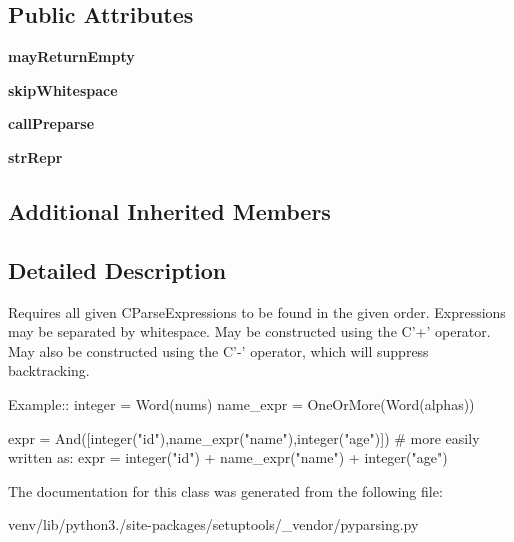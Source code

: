 \subsection*{Public Attributes}
\begin{DoxyCompactItemize}
\item 
\mbox{\label{classsetuptools_1_1__vendor_1_1pyparsing_1_1_and_ae9cb0d562228054fc0e1a2ceae114ede}} 
{\bfseries may\+Return\+Empty}
\item 
\mbox{\label{classsetuptools_1_1__vendor_1_1pyparsing_1_1_and_ab1188a09b994a812be606006583ecb59}} 
{\bfseries skip\+Whitespace}
\item 
\mbox{\label{classsetuptools_1_1__vendor_1_1pyparsing_1_1_and_afd59d88d0a9b614c17c0c57a8e6367c5}} 
{\bfseries call\+Preparse}
\item 
\mbox{\label{classsetuptools_1_1__vendor_1_1pyparsing_1_1_and_a36eb67d1cebb650105eab01844b4b483}} 
{\bfseries str\+Repr}
\end{DoxyCompactItemize}
\subsection*{Additional Inherited Members}


\subsection{Detailed Description}
\begin{DoxyVerb}Requires all given C{ParseExpression}s to be found in the given order.
Expressions may be separated by whitespace.
May be constructed using the C{'+'} operator.
May also be constructed using the C{'-'} operator, which will suppress backtracking.

Example::
    integer = Word(nums)
    name_expr = OneOrMore(Word(alphas))

    expr = And([integer("id"),name_expr("name"),integer("age")])
    # more easily written as:
    expr = integer("id") + name_expr("name") + integer("age")
\end{DoxyVerb}
 

The documentation for this class was generated from the following file\+:\begin{DoxyCompactItemize}
\item 
venv/lib/python3./site-\/packages/setuptools/\+\_\+vendor/pyparsing.\+py\end{DoxyCompactItemize}
